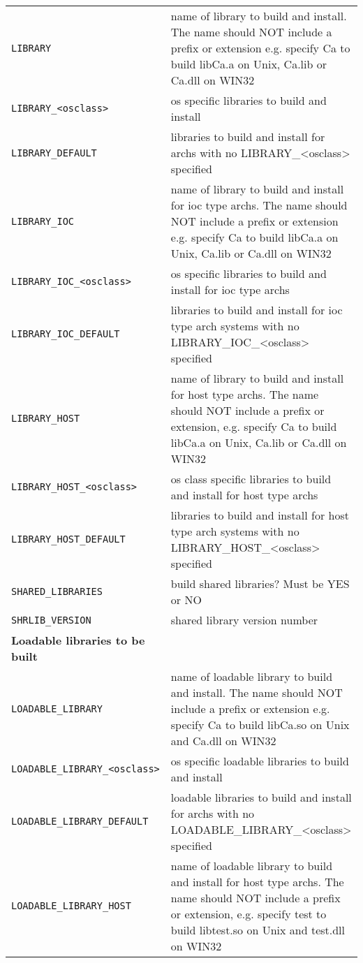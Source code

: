 \begin{center}
\begin{longtable}{p{2.94784in}p{3.76247in}}
\hline
\verb|LIBRARY| & name of library to build and install. The name should NOT include a prefix or extension e.g. specify Ca to build libCa.a on Unix, Ca.lib or Ca.dll on WIN32\\
\verb|LIBRARY_<osclass>| & os specific libraries to build and install\\
\verb|LIBRARY_DEFAULT| & libraries to build and install for archs with no LIBRARY\_\textless{}osclass\textgreater{} specified\\
\verb|LIBRARY_IOC| & name of library to build and install for ioc type archs. The name should NOT include a prefix or extension e.g. specify Ca to build libCa.a on Unix, Ca.lib or Ca.dll on WIN32\\
\verb|LIBRARY_IOC_<osclass>| & os specific libraries to build and install for ioc type archs\\
\verb|LIBRARY_IOC_DEFAULT| & libraries to build and install for ioc type arch systems with no LIBRARY\_IOC\_\textless{}osclass\textgreater{} specified\\
\verb|LIBRARY_HOST| & name of library to build and install for host type archs. The name should NOT include a prefix or extension, e.g. specify Ca to build libCa.a on Unix, Ca.lib or Ca.dll on WIN32\\
\verb|LIBRARY_HOST_<osclass>| & os class specific libraries to build and install for host type archs\\
\verb|LIBRARY_HOST_DEFAULT| & libraries to build and install for host type arch systems with no LIBRARY\_HOST\_\textless{}osclass\textgreater{} specified\\
\verb|SHARED_LIBRARIES| & build shared libraries? Must be YES or NO\\
\verb|SHRLIB_VERSION| & shared library version number\\
\textbf{Loadable libraries to be built} & \\
\hline
\verb|LOADABLE_LIBRARY| & name of loadable library to build and install. The name should NOT include a prefix or extension e.g. specify Ca to build libCa.so on Unix and Ca.dll on WIN32\\
\verb|LOADABLE_LIBRARY_<osclass>| & os specific loadable libraries to build and install\\
\verb|LOADABLE_LIBRARY_DEFAULT| & loadable libraries to build and install for archs with no LOADABLE\_LIBRARY\_\textless{}osclass\textgreater{} specified\\
\verb|LOADABLE_LIBRARY_HOST| & name of loadable library to build and install for host type archs. The name should NOT include a prefix or extension, e.g. specify test to build libtest.so on Unix and test.dll on WIN32\\

\end{longtable}
\end{center}

